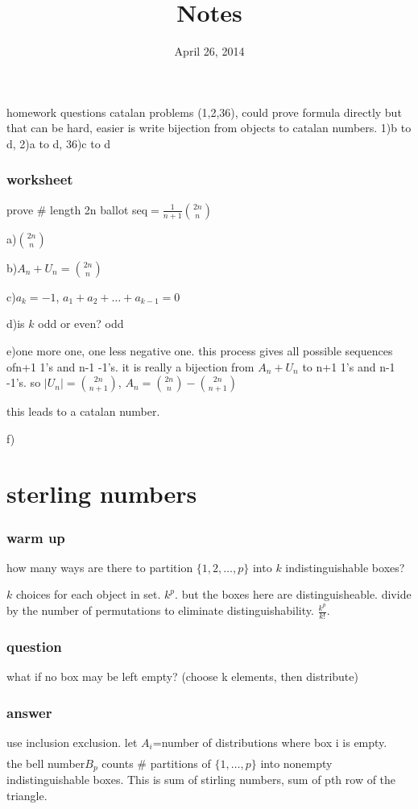 \documentclass{article}
\newcommand{\abs}[1]{\left\lvert #1 \right\rvert}
\begin{document}
\title{Notes}
\date{April 26, 2014}
\maketitle
homework questions
catalan problems (1,2,36), could prove formula directly but that can be hard, easier is write bijection from objects to catalan numbers.
1)b to d, 2)a to d, 36)c to d

\subsubsection*{worksheet}

prove \# length 2n ballot seq$=\frac{1}{n+1}\binom{2n}{n}$

a)$\binom{2n}{n}$

b)$A_n+U_n=\binom{2n}{n}$

c)$a_k=-1$, $a_1+a_2+\dots+a_{k-1}=0$

d)is $k$ odd or even? odd

e)one more one, one less negative one. this process gives all possible sequences ofn+1 1's and n-1 -1's. it is really a bijection from $A_n+U_n$ to n+1 1's and n-1 -1's. so $\abs{U_n}=\binom{2n}{n+1}$, $A_n=\binom{2n}{n}-\binom{2n}{n+1}$

this leads to a catalan number.


f)

\section*{sterling numbers}
\subsubsection*{warm up}
how many ways are there to partition $\{1,2,\dots,p\}$ into $k$ indistinguishable boxes?

$k$ choices for each object in set. $k^p$. but the boxes here are distinguisheable. divide by the number of permutations to eliminate distinguishability. $\frac{k^p}{k!}$.

\subsubsection*{question}
what if no box may be left empty? (choose k elements, then distribute)
\subsubsection*{answer}
use inclusion exclusion. let $A_i$=number of distributions where box i is empty.
\begin{align*}
  
\end{align*}
the bell number$B_p$ counts \# partitions of $\{1,\dots,p\}$ into nonempty indistinguishable boxes. This is sum of stirling numbers, sum of pth row of the triangle. 
\end{document}
